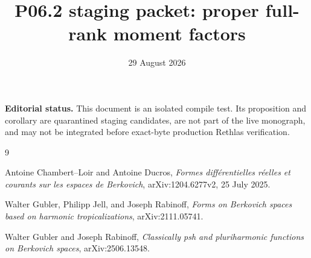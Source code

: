 \documentclass[11pt]{article}
\title{P06.2 staging packet: proper full-rank moment factors}
\author{}
\date{29 August 2026}
\begin{document}
\maketitle

\noindent
\textbf{Editorial status.}
This document is an isolated compile test.  Its proposition and corollary
are quarantined staging candidates, are not part of the live monograph, and
may not be integrated before exact-byte production Rethlas verification.




\begin{sloppypar}
\begin{thebibliography}{9}
\raggedright

Antoine Chambert--Loir and Antoine Ducros,
\emph{Formes diff\'erentielles r\'eelles et courants sur les espaces de
Berkovich}, arXiv:1204.6277v2, 25 July 2025.

Walter Gubler, Philipp Jell, and Joseph Rabinoff,
\emph{Forms on Berkovich spaces based on harmonic tropicalizations},
arXiv:2111.05741.

Walter Gubler and Joseph Rabinoff,
\emph{Classically psh and pluriharmonic functions on Berkovich spaces},
arXiv:2506.13548.

\end{thebibliography}
\end{sloppypar}
\end{document}
